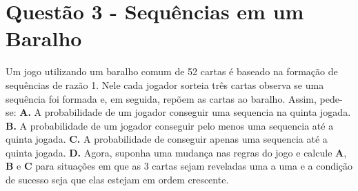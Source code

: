 \documentclass[a4paper, 12pt]{article}
\begin{document}
\section*{Questão 3 - Sequências em um Baralho}
\large {Um jogo utilizando um baralho comum de 52 cartas é baseado na formação de sequências de razão 1. Nele cada jogador sorteia três cartas observa se uma sequência foi formada e, em seguida, repõem as cartas ao baralho. Assim, pede-se:}
\newline
\newline
\textbf{A.}  A probabilidade de um jogador conseguir uma sequencia na quinta jogada.
\newline
\newline
\textbf{B.} A probabilidade de um jogador conseguir pelo menos uma sequencia até a quinta jogada.
\newline
\newline
\textbf{C.}  A probabilidade de conseguir apenas uma sequencia até a quinta jogada.
\newline
\newline
\textbf{D.} Agora, suponha uma mudança nas regras do jogo e calcule \textbf{A}, \textbf{B} e \textbf{C} para situações em que as 3 cartas sejam reveladas uma a uma e a condição de sucesso seja que elas estejam em ordem crescente.
\end{document}
